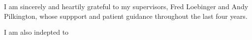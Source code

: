 I am sincerely and heartily grateful to my supervisors, Fred Loebinger and Andy Pilkington, whose suppport and patient guidance throughout the last four years.

I am also indepted to 
